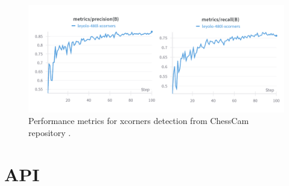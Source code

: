 \begin{figure}[H]
\centering
\includegraphics[width=\textwidth]{figures/results/machine-learning/xcorners-metrics.png}
\caption[Performance xcorners detection (ChessCam)]{Performance metrics for xcorners detection from ChessCam repository \cite{wandb:xcorner-detection}.}
\label{fig:chesscam-xcorners-metrics}
\end{figure}

\section{API}



